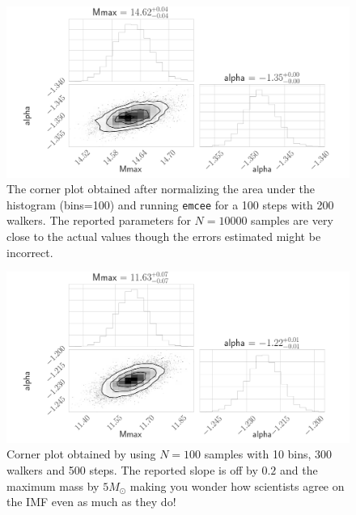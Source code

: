 \documentclass[12pt,usletter,english]{article}
\begin{document}
\begin{figure}[!h]
  \centering \includegraphics[width=13cm]{theta_1e4.png}
  \caption{The corner plot obtained after normalizing the area under
    the histogram (bins=100) and running \texttt{emcee} for a 100
    steps with 200 walkers. The reported parameters for $N=10000$
    samples are very close to the actual values though the errors
    estimated might be incorrect.
    \label{fig:corner_1e4}}
\end{figure}

\begin{figure}[!h]
  \centering \includegraphics[width=13cm]{theta_1e2.png}
  \caption{Corner plot obtained by using $N=100$ samples with 10 bins,
    300 walkers and 500 steps. The reported slope is off by $0.2$ and
    the maximum mass by $5M_{\odot}$ making you wonder how scientists
    agree on the IMF even as much as they do!
    \label{fig:corner_1e2}}
\end{figure}
\end{document}
